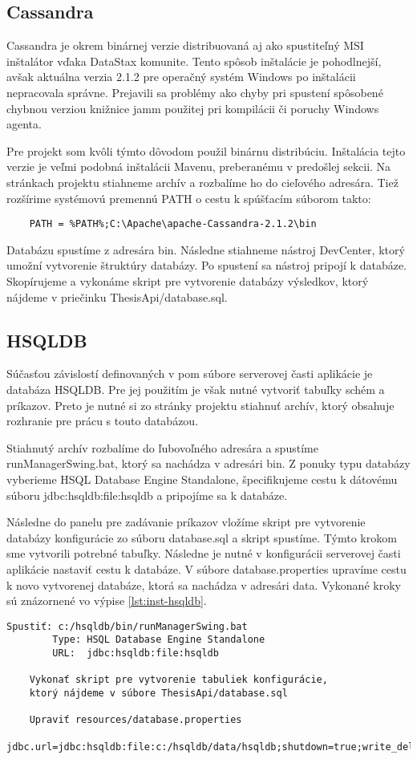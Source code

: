 	\subsection{Cassandra}	%
	Cassandra je okrem binárnej verzie distribuovaná aj ako spustiteľný MSI inštalátor vďaka DataStax komunite. Tento spôsob inštalácie je pohodlnejší, avšak aktuálna verzia 2.1.2 pre operačný systém Windows po inštalácii nepracovala správne. Prejavili sa problémy ako chyby pri spustení spôsobené chybnou verziou knižnice jamm použitej pri kompilácii či poruchy Windows agenta.
	
	Pre projekt som kvôli týmto dôvodom použil binárnu distribúciu. Inštalácia tejto verzie je veľmi podobná inštalácii Mavenu, preberanému v predošlej sekcii. Na stránkach projektu stiahneme archív a rozbalíme ho do cieľového adresára. Tiež rozšírime systémovú premennú PATH o cestu k spúšťacím súborom takto:
	\begin{lstlisting}
	PATH = %PATH%;C:\Apache\apache-Cassandra-2.1.2\bin
	\end{lstlisting}
	
	Databázu spustíme z adresára bin. Následne stiahneme nástroj DevCenter, ktorý umožní vytvorenie štruktúry databázy. Po spustení sa nástroj pripojí k databáze.
	Skopírujeme a vykonáme skript pre vytvorenie databázy výsledkov, ktorý nájdeme v priečinku ThesisApi/database.sql.
	
	\subsection{HSQLDB}
	Súčasťou závislostí definovaných v pom súbore serverovej časti aplikácie je databáza HSQLDB. Pre jej použitím je však nutné vytvoriť tabuľky schém a príkazov. Preto je nutné si zo stránky projektu stiahnuť archív, ktorý obsahuje rozhranie pre prácu s touto databázou.
	
	Stiahnutý archív rozbalíme do ľubovoľného adresára a spustíme runManagerSwing.bat, ktorý sa nachádza v adresári bin. Z ponuky typu databázy vyberieme HSQL Database Engine Standalone, špecifikujeme cestu k dátovému súboru jdbc:hsqldb:file:hsqldb a pripojíme sa k databáze.
	
	Následne do panelu pre zadávanie príkazov vložíme skript pre vytvorenie databázy konfigurácie zo súboru database.sql a skript spustíme. Týmto krokom sme vytvorili potrebné tabuľky. Následne je nutné v konfigurácii serverovej časti aplikácie nastaviť cestu k databáze. V súbore database.properties upravíme cestu k novo vytvorenej databáze, ktorá sa nachádza v adresári data. Vykonané kroky sú znázornené vo výpise \ref{lst:inst-hsqldb}.
	\begin{lstlisting}[label=lst:inst-hsqldb,caption=Vytvorenie štruktúry databázy konfigurácie]
	Spustiť: c:/hsqldb/bin/runManagerSwing.bat
		Type: HSQL Database Engine Standalone
		URL:  jdbc:hsqldb:file:hsqldb

	Vykonať skript pre vytvorenie tabuliek konfigurácie,
	ktorý nájdeme v súbore ThesisApi/database.sql
	
	Upraviť resources/database.properties
		jdbc.url=jdbc:hsqldb:file:c:/hsqldb/data/hsqldb;shutdown=true;write_delay=false;
	\end{lstlisting}	

